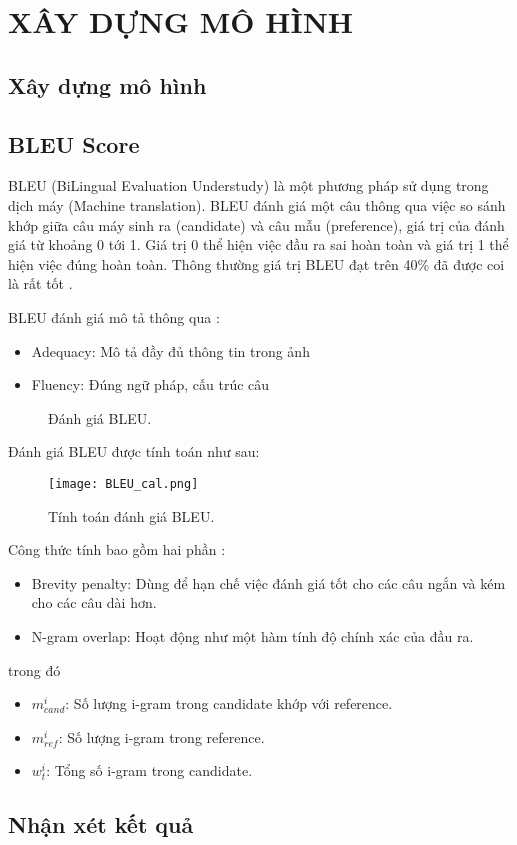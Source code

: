 \chapter{XÂY DỰNG MÔ HÌNH}

\label{Chapter3}
\section{Xây dựng mô hình}

\section{BLEU Score}
BLEU (BiLingual Evaluation Understudy) là một phương pháp sử dụng trong dịch máy (Machine translation). BLEU đánh giá một câu thông qua việc so sánh khớp giữa câu máy sinh ra (candidate) và câu mẫu (preference), giá trị của đánh giá từ khoảng 0 tới 1. Giá trị 0 thể hiện việc đầu ra sai hoàn toàn và giá trị 1 thể hiện việc đúng hoàn toàn. Thông thường giá trị BLEU đạt trên 40\% đã được coi là rất tốt \cite{lavie2010evaluating}.

BLEU đánh giá mô tả thông qua \cite{papineni2002bleu}:
\begin{itemize}
	\item Adequacy: Mô tả đầy đủ thông tin trong ảnh
	\item Fluency: Đúng ngữ pháp, cấu trúc câu
\end{itemize}

\begin{figure}[h!]
	\centering
	\caption{Đánh giá BLEU.}
\end{figure}

Đánh giá BLEU được tính toán như sau:
\begin{figure}[h!]
	\centering
	\texttt{[image: BLEU\_cal.png]}
	\caption{Tính toán đánh giá BLEU.}
\end{figure} 

Công thức tính bao gồm hai phần \cite{web:10}:
\begin{itemize}
	\item Brevity penalty:
	Dùng để hạn chế việc đánh giá tốt cho các câu ngắn và kém cho các câu dài hơn.
	\item N-gram overlap:
	Hoạt động như một hàm tính độ chính xác của đầu ra.
\end{itemize}

trong đó
\begin{itemize}
	\item $m_{cand}^i$: Số lượng i-gram trong candidate khớp với reference.
	\item $m_{ref}^i$: Số lượng i-gram trong reference.
	\item $w_{t}^i$: Tổng số i-gram trong candidate.
\end{itemize}
\section{Nhận xét kết quả}